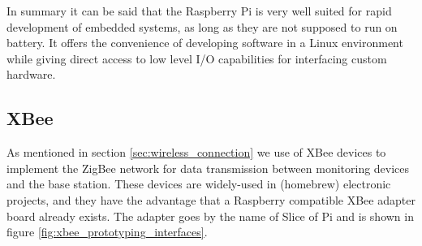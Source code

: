 In summary it can be said that the Raspberry Pi is very well suited for rapid development of embedded systems, as long as they are not supposed to run on battery. It offers the convenience of developing software in a Linux environment while giving direct access to low level I/O capabilities for interfacing custom hardware.

\subsection{XBee}
As mentioned in section \ref{sec:wireless_connection} we use of XBee devices to implement the ZigBee network for data transmission between monitoring devices and the base station. These devices are widely-used in (homebrew) electronic projects, and they have the advantage that a Raspberry compatible XBee adapter board already exists. The adapter goes by the name of Slice of Pi and is shown in figure \ref{fig:xbee_prototyping_interfaces}.
